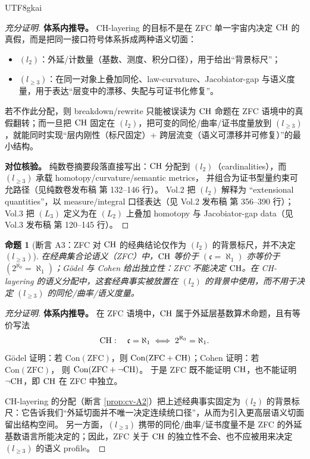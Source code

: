 \documentclass[12pt]{article}
\newtheorem{proposition}{命题}[section]
\begin{document}
\begin{CJK*}{UTF8}{gkai}
\begin{proof}[充分证明]
\textbf{体系内推导。}
CH-layering 的目标不是在 ZFC 单一宇宙内决定 $\mathrm{CH}$ 的真假，而是把同一接口符号体系拆成两种语义切面：
\begin{itemize}
  \item $(l_2)$：外延/计数量（基数、测度、积分口径），用于给出“背景标尺”；
  \item $(l_{\ge3})$：在同一对象上叠加同伦、law-curvature、Jacobiator-gap 与语义度量，用于表达“层变中的漂移、失配与可证书化修复”。
\end{itemize}
若不作此分配，则 breakdown/rewrite 只能被误读为 $\mathrm{CH}$ 命题在 ZFC 语境中的真假翻转；而一旦把 $\mathrm{CH}$ 固定在 $(l_2)$，把可变的同伦/曲率/证书度量放到 $(l_{\ge3})
  $，就能同时实现“层内刚性（标尺固定）+ 跨层流变（语义可漂移并可修复）”的最小结构。

\textbf{对位核验。}
纯数卷摘要段落直接写出：$\mathrm{CH}$ 分配到 $(l_2)$（cardinalities），而 $(l_{\ge3})$ 承载 homotopy/curvature/semantic metrics，
  并组合为证书型量约束可允路径（见纯数卷发布稿\cite{GaoZheng2025GFramework} 第 132--146 行）。
Vol.2 把 $(l_2)$ 解释为 “extensional quantities”，以 measure/integral 口径表达（见 Vol.2 发布稿\cite{GaoZhengAppVol2} 第 356--390 行）；
  Vol.3 把 $(L_3)$ 定义为在 $(L_2)$ 上叠加 homotopy 与 Jacobiator-gap data（见 Vol.3 发布稿\cite{GaoZhengAppVol3} 第 120--145 行）。
\end{proof}

\begin{proposition}[断言 A3：ZFC 对 $\mathrm{CH}$ 的经典结论仅作为 $(l_2)$ 的背景标尺，并不决定 $(l_{\ge3})$]\label{prop:cv-A3}
在经典集合论语义（ZFC）中，$\mathrm{CH}$ 等价于 $(\mathfrak c=\aleph_1)$ 亦等价于 $(2^{\aleph_0}=\aleph_1)$；Gödel 与 Cohen 给出独立性：ZFC 不能决定
  $\mathrm{CH}$。在 CH-layering 的语义分配中，这套经典事实被放置在 $(l_2)$ 的背景中使用，而不用于决定 $(l_{\ge3})$ 的同伦/曲率/语义度量。
\end{proposition}

\begin{proof}[充分证明]
\textbf{体系内推导。}
在 ZFC 语境中，$\mathrm{CH}$ 属于外延层基数算术命题，且有等价写法
\[
  \mathrm{CH}:\quad \mathfrak c=\aleph_1\iff 2^{\aleph_0}=\aleph_1.
\]
Gödel 证明：若 $\mathrm{Con}(\mathrm{ZFC})$，则 $\mathrm{Con}(\mathrm{ZFC}+\mathrm{CH})$；Cohen 证明：若 $\mathrm{Con}(\mathrm{ZFC})$，
  则 $\mathrm{Con}(\mathrm{ZFC}+\neg\mathrm{CH})$。
于是 ZFC 既不能证明 $\mathrm{CH}$，也不能证明 $\neg\mathrm{CH}$，即 $\mathrm{CH}$ 在 ZFC 中独立。

CH-layering 的分配（断言 \ref{prop:cv-A2}）把上述经典事实固定为 $(l_2)$ 的背景标尺：它告诉我们“外延切面并不唯一决定连续统口径”，从而为引入更高层语义切面留出结构空间。
另一方面，$(l_{\ge3})$ 携带的同伦/曲率/证书度量不是 ZFC 的外延基数语言所能决定的；因此，ZFC 关于 $\mathrm{CH}$ 的独立性不会、也不应被用来决定 $(l_{\ge3})$ 的语义 profile。


\end{proof}
\end{CJK*}
\end{document}
